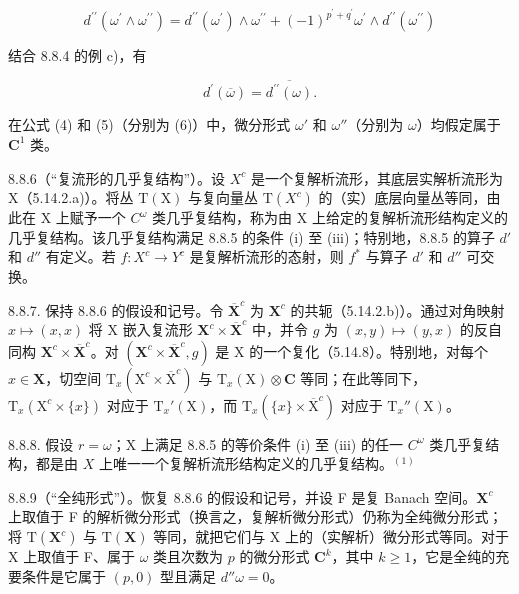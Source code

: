 \[
d ^ {\prime \prime} (\omega^ {\prime} \wedge \omega^ {\prime \prime}) = d ^ {\prime \prime} (\omega^ {\prime}) \wedge \omega^ {\prime \prime} + (- 1) ^ {p ^ {\prime} + q ^ {\prime}} \omega^ {\prime} \wedge d ^ {\prime \prime} (\omega^ {\prime \prime})\tag{5}
\]

结合 8.8.4 的例 c)，有

\[
d ^ {\prime} (\overline {{\omega}}) = \overline {{d ^ {\prime \prime} (\omega)}}.\tag{6}
\]

在公式 (4) 和 (5)（分别为 (6)）中，微分形式 \(\omega'\) 和 \(\omega''\)（分别为 \(\omega\)）均假定属于 \(\mathbf{C}^1\) 类。

8.8.6（“复流形的几乎复结构”）。设 \(X^c\) 是一个复解析流形，其底层实解析流形为 X（5.14.2.a)）。将丛 \(\mathrm{T}(\mathrm{X})\) 与复向量丛 \(\mathrm{T}(X^c)\) 的（实）底层向量丛等同，由此在 X 上赋予一个 \(C^\omega\) 类几乎复结构，称为由 X 上给定的复解析流形结构定义的几乎复结构。该几乎复结构满足 8.8.5 的条件 (i) 至 (iii)；特别地，8.8.5 的算子 \(d'\) 和 \(d''\) 有定义。若 \(f: X^c \to Y^c\) 是复解析流形的态射，则 \(f^*\) 与算子 \(d'\) 和 \(d''\) 可交换。

8.8.7. 保持 8.8.6 的假设和记号。令 \(\overline{\mathbf{X}}^c\) 为 \(\mathbf{X}^c\) 的共轭（5.14.2.b)）。通过对角映射 \(x \mapsto (x, x)\) 将 X 嵌入复流形 \(\mathbf{X}^c \times \overline{\mathbf{X}}^c\) 中，并令 \(g\) 为 \((x, y) \mapsto (y, x)\) 的反自同构 \(\mathbf{X}^c \times \overline{\mathbf{X}}^c\)。对 \((\mathbf{X}^c \times \overline{\mathbf{X}}^c, g)\) 是 X 的一个复化（5.14.8）。特别地，对每个 \(x \in \mathbf{X}\)，切空间 \(\mathrm{T}_x(\mathrm{X}^c \times \overline{\mathrm{X}}^c)\) 与 \(\mathrm{T}_x(\mathrm{X}) \otimes \mathbf{C}\) 等同；在此等同下，\(\mathrm{T}_x(\mathrm{X}^c \times \{x\})\) 对应于 \(\mathrm{T}_x'(\mathrm{X})\)，而 \(\mathrm{T}_x(\{x\} \times \overline{\mathrm{X}}^c)\) 对应于 \(\mathrm{T}_x''(\mathrm{X})\)。

8.8.8. 假设 \(r = \omega\)；X 上满足 8.8.5 的等价条件 (i) 至 (iii) 的任一 \(C^\omega\) 类几乎复结构，都是由 \(X\) 上唯一一个复解析流形结构定义的几乎复结构。\(^{(1)}\)

8.8.9（“全纯形式”）。恢复 8.8.6 的假设和记号，并设 F 是复 Banach 空间。\(\mathbf{X}^c\) 上取值于 F 的解析微分形式（换言之，复解析微分形式）仍称为全纯微分形式；将 \(\mathrm{T}(\mathbf{X}^c)\) 与 \(\mathrm{T}(\mathbf{X})\) 等同，就把它们与 X 上的（实解析）微分形式等同。对于 X 上取值于 F、属于 \(\omega\) 类且次数为 \(p\) 的微分形式 \(\mathbf{C}^k\)，其中 \(k \geqslant 1\)，它是全纯的充要条件是它属于 \((p, 0)\) 型且满足 \(d''\omega = 0\)。

